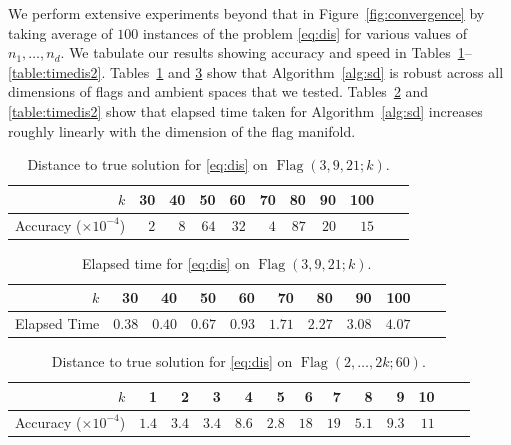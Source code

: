 \documentclass[11pt,reqno]{amsart}%
\theoremstyle{definition}
\theoremstyle{remark}
\DeclareMathOperator{\Flag}{Flag}
\begin{document}
We perform extensive experiments beyond that in Figure~\ref{fig:convergence} by taking average of $100$ instances of the problem \eqref{eq:dis} for various values of $n_1,\dots,n_d$. We tabulate our results showing accuracy and speed in Tables~\ref{table:distdis1}--\ref{table:timedis2}. Tables~\ref{table:distdis1} and \ref{table:distdis2} show that Algorithm~\ref{alg:sd} is robust across all dimensions of flags and  ambient spaces that we tested. Tables~\ref{table:timedis1} and \ref{table:timedis2} show that elapsed time taken for Algorithm~\ref{alg:sd} increases roughly linearly with the dimension of the flag manifold.

\begin{table}[ht]
\renewcommand{\arraystretch}{1.3}
	\centering
	\begin{tabular}{r|rrrrrrrrrr}
		$k$ & 30 & 40 & 50 & 60 & 70 & 80 & 90 & 100\\
		\hline\hline
		Accuracy ($\times 10^{-4}$) & $2$ & $8$ & $64$ & $32$ & $4$ & $87$ & $20$ & $15$ \\ 
	\end{tabular} 
\vspace{1ex}
	\caption{Distance to true solution for \eqref{eq:dis} on  $\Flag(3,9,21;k)$.}
	\label{table:distdis1}
\vspace{-4ex}
\end{table}

\begin{table}[ht]
\renewcommand{\arraystretch}{1.3}
	\centering
	\begin{tabular}{r|rrrrrrrrrr}
		$k$ & 30 & 40 & 50 & 60 & 70 & 80 & 90 & 100\\
		\hline\hline
		Elapsed Time & $0.38$ & $0.40$ & $0.67$ & $0.93$ & $1.71$ & $2.27$ & $3.08$ & $4.07$ \\ 
	\end{tabular} 
\vspace{1ex}
	\caption{Elapsed time for \eqref{eq:dis} on $\Flag(3,9,21;k)$.}
	\label{table:timedis1}
\vspace{-4ex}
\end{table}

\begin{table}[ht]
\renewcommand{\arraystretch}{1.3}
	\centering
	\begin{tabular}{r|rrrrrrrrrrrr}
		$k$ & 1 & 2 & 3 & 4 & 5 & 6 & 7 & 8 & 9 & 10\\
		\hline\hline
		Accuracy ($\times 10^{-4}$) & $1.4$ & $3.4$ & $3.4$ & $8.6$ & $2.8$ & $18$ & $19$ & $5.1$ & $9.3$ & $11$\\ 
	\end{tabular} 
\vspace{1ex}
	\caption{Distance to true solution for \eqref{eq:dis} on $\Flag(2,\dots,2k;60)$.}
	\label{table:distdis2}
\vspace{-4ex}
\end{table}
\end{document}

